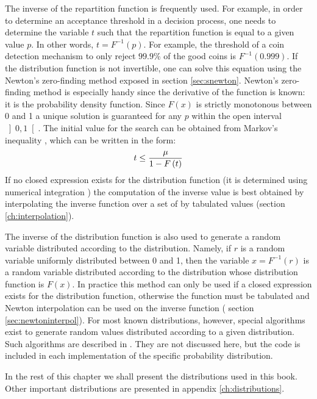The inverse of the repartition function is frequently used. For
example, in order to determine an acceptance threshold in a
decision process, one needs to determine the variable $t$ such
that the repartition function is equal to a given value $p$. In
other words, $t=F^{-1}\left(p\right)$. For example, the threshold
of a coin detection mechanism to only reject $99.9\%$ of the good
coins is $F^{-1}\left(0.999\right)$. If the distribution function
is not invertible, one can solve this equation using the Newton's
zero-finding method exposed in section \ref{sec:snewton}. Newton's
zero-finding method is especially handy since the derivative of
the function is known: it is the probability density function.
Since $F\left(x\right)$ is strictly monotonous between 0 and 1 a
unique solution is guaranteed for any $p$ within the open interval
$\left]0,1\right[$. The initial value for the search can be
obtained from Markov's inequality \cite{CorLeiRiv}, which can be
written in the form:
\begin{equation}
  t\le {\displaystyle \mu \over\displaystyle 1-F\left(t\right)}
\end{equation}
If no closed expression exists for the distribution function (it
is determined using numerical integration \eg) the computation of
the inverse value is best obtained by interpolating the inverse
function over a set of by tabulated values (\cf section
\ref{ch:interpolation}).

The inverse of the distribution function is also used to generate
a random variable distributed according to the distribution.
Namely, if $r$ is a random variable uniformly distributed between
0 and 1, then the variable $x=F^{-1}\left(r\right)$ is a random
variable distributed according to the distribution whose
distribution function is $F\left(x\right)$. In practice this
method can only be used if a closed expression exists for the
distribution function, otherwise the function must be tabulated
and Newton interpolation can be used on the inverse function (\cf
section \ref{sec:newtoninterpol}). For most known distributions,
however, special algorithms exist to generate random values
distributed according to a given distribution. Such algorithms are
described in \cite{LawKel}. They are not discussed here, but the
code is included in each implementation of the specific
probability distribution.

In the rest of this chapter we shall present the distributions used in this book.
Other important distributions are presented in appendix \ref{ch:distributions}.

